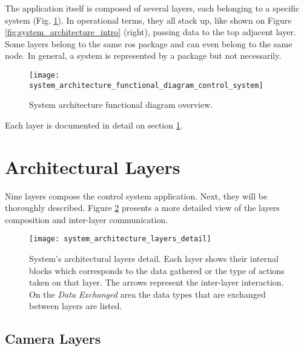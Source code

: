 The application itself is composed of several layers, each belonging to a specific system (Fig. \ref{fig:system_architecture_functional_diagram_control_system}). In operational terms, they all stack up, like shown on Figure \ref{fig:system_architecture_intro} (right), passing data to the top adjacent layer. Some layers belong to the same \gls{ros} package and can even belong to the same node. In general, a system is represented by a package but not necessarily.

\begin{figure}[htbp]
	\centering
	\texttt{[image: system\_architecture\_functional\_diagram\_control\_system]}
	\caption{System architecture functional diagram overview.}
	\label{fig:system_architecture_functional_diagram_control_system}
\end{figure}

Each layer is documented in detail on section \ref{sec:system_architectural_layers}.



\section{Architectural Layers}
\label{sec:system_architectural_layers}

Nine layers compose the control system application. Next, they will be thoroughly described. Figure \ref{fig:system_architecture_layers_detail} presents a more detailed view of the layers composition and inter-layer communication.

\begin{figure}[htbp]
	\centering
	\texttt{[image: system\_architecture\_layers\_detail]}
	\caption{System's architectural layers detail. Each layer shows their internal blocks which corresponds to the data gathered or the type of actions taken on that layer. The arrows represent the inter-layer interaction. On the \textit{Data Exchanged} area the data types that are exchanged between layers are listed. }
	\label{fig:system_architecture_layers_detail}
\end{figure}

\subsection{Camera Layers}
\label{subsec:system_architectural_camera_layers}


